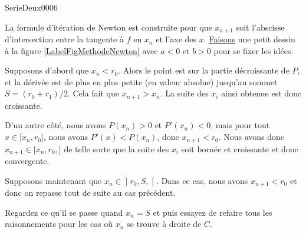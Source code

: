 
\begin{corrige}{SerieDeux0006}

    La formule d'itération de Newton est construite pour que $x_{n+1}$ soit l'abscisse d'intersection entre la tangente à $f$ en $x_n$ et l'axe des $x$. \href{https://github.com/LaurentClaessens/phystricks}{Faisons} une petit dessin à la figure \ref{LabelFigMethodeNewton} avec $a<0$ et $b>0$ pour se fixer les idées.

\newcommand{\CaptionFigMethodeNewton}{La méthode de Newton pour une parabole}


Supposons d'abord que $x_n<r_0$. Alors le point est sur la partie décroissante de $P$, et la dérivée est de plus en plus petite (en valeur absolue) jusqu'au sommet $S=(r_0+r_1)/2$. Cela fait que $x_{n+1}>x_n$. La suite des $x_i$ ainsi obtenue est donc croissante.

D'un autre côté, nous avons $P(x_n)>0$ et $P'(x_n)<0$, mais pour tout $x\in\mathopen[ x_n , r_0 \mathclose]$, nous avons $P'(x)<P(x_n)$, donc $x_{n+1}<r_0$. Nous avons donc $x_{n+1}\in\mathopen[ x_n,r_0 ,  \mathclose]$ de telle sorte que la suite des $x_i$ soit bornée et croissante et donc convergente.

Supposons maintenant que $x_n\in\mathopen] r_0,S ,  \mathclose[$. Dans ce cas, nous avons $x_{n+1}<r_0$ et donc on repasse tout de suite au cas précédent.

Regardez ce qu'il se passe quand $x_n=S$ et puis essayez de refaire tous les raisonnements pour les cas où $x_n$ se trouve à droite de $C$.

\end{corrige}
